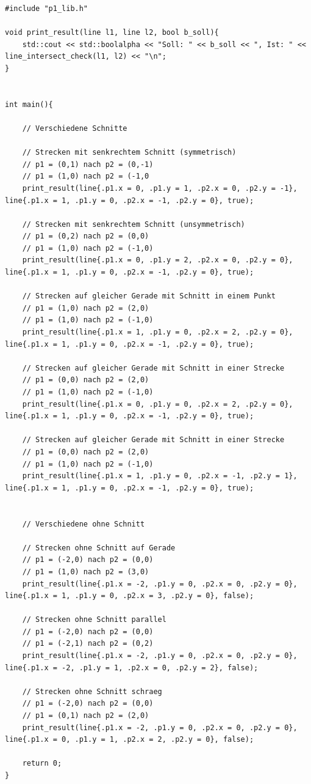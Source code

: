 \documentclass[12pt]{scrartcl}
\begin{document}
\begin{lstlisting}[style=CStyle, caption={testing.cpp: Testen der Bibliotheksfunktionen},captionpos=b, label={lst:test_code}]
#include "p1_lib.h"

void print_result(line l1, line l2, bool b_soll){
    std::cout << std::boolalpha << "Soll: " << b_soll << ", Ist: " << line_intersect_check(l1, l2) << "\n";
}


int main(){

    // Verschiedene Schnitte

    // Strecken mit senkrechtem Schnitt (symmetrisch)
    // p1 = (0,1) nach p2 = (0,-1)
    // p1 = (1,0) nach p2 = (-1,0
    print_result(line{.p1.x = 0, .p1.y = 1, .p2.x = 0, .p2.y = -1}, line{.p1.x = 1, .p1.y = 0, .p2.x = -1, .p2.y = 0}, true);

    // Strecken mit senkrechtem Schnitt (unsymmetrisch)
    // p1 = (0,2) nach p2 = (0,0)
    // p1 = (1,0) nach p2 = (-1,0)
    print_result(line{.p1.x = 0, .p1.y = 2, .p2.x = 0, .p2.y = 0}, line{.p1.x = 1, .p1.y = 0, .p2.x = -1, .p2.y = 0}, true);

    // Strecken auf gleicher Gerade mit Schnitt in einem Punkt
    // p1 = (1,0) nach p2 = (2,0)
    // p1 = (1,0) nach p2 = (-1,0)
    print_result(line{.p1.x = 1, .p1.y = 0, .p2.x = 2, .p2.y = 0}, line{.p1.x = 1, .p1.y = 0, .p2.x = -1, .p2.y = 0}, true);

    // Strecken auf gleicher Gerade mit Schnitt in einer Strecke
    // p1 = (0,0) nach p2 = (2,0)
    // p1 = (1,0) nach p2 = (-1,0)
    print_result(line{.p1.x = 0, .p1.y = 0, .p2.x = 2, .p2.y = 0}, line{.p1.x = 1, .p1.y = 0, .p2.x = -1, .p2.y = 0}, true);

    // Strecken auf gleicher Gerade mit Schnitt in einer Strecke
    // p1 = (0,0) nach p2 = (2,0)
    // p1 = (1,0) nach p2 = (-1,0)
    print_result(line{.p1.x = 1, .p1.y = 0, .p2.x = -1, .p2.y = 1}, line{.p1.x = 1, .p1.y = 0, .p2.x = -1, .p2.y = 0}, true);


    // Verschiedene ohne Schnitt

    // Strecken ohne Schnitt auf Gerade
    // p1 = (-2,0) nach p2 = (0,0)
    // p1 = (1,0) nach p2 = (3,0)
    print_result(line{.p1.x = -2, .p1.y = 0, .p2.x = 0, .p2.y = 0}, line{.p1.x = 1, .p1.y = 0, .p2.x = 3, .p2.y = 0}, false);

    // Strecken ohne Schnitt parallel
    // p1 = (-2,0) nach p2 = (0,0)
    // p1 = (-2,1) nach p2 = (0,2)
    print_result(line{.p1.x = -2, .p1.y = 0, .p2.x = 0, .p2.y = 0}, line{.p1.x = -2, .p1.y = 1, .p2.x = 0, .p2.y = 2}, false);

    // Strecken ohne Schnitt schraeg
    // p1 = (-2,0) nach p2 = (0,0)
    // p1 = (0,1) nach p2 = (2,0)
    print_result(line{.p1.x = -2, .p1.y = 0, .p2.x = 0, .p2.y = 0}, line{.p1.x = 0, .p1.y = 1, .p2.x = 2, .p2.y = 0}, false);

    return 0;
}
\end{lstlisting}
\end{document}
